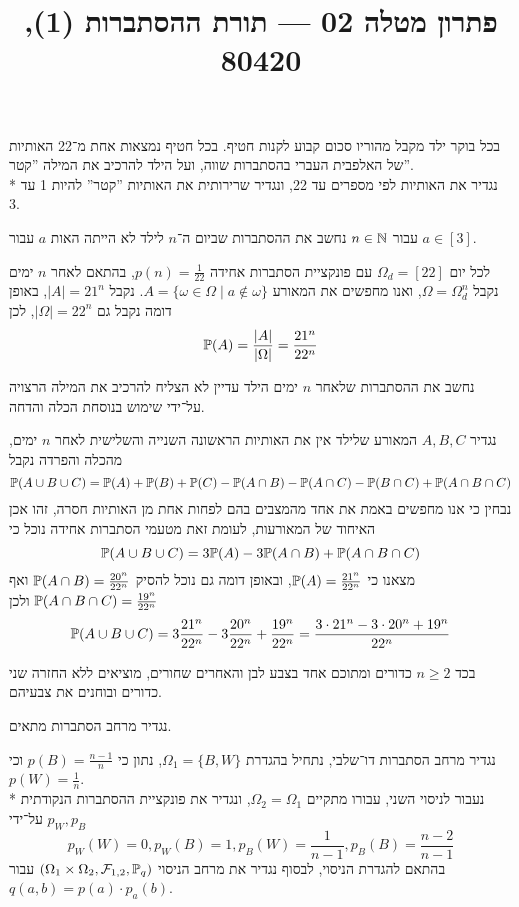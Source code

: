 
\title{פתרון מטלה 02 --- תורת ההסתברות (1), 80420}


\maketitle
\maketitleprint{}

\Question{}
בכל בוקר ילד מקבל מהוריו סכום קבוע לקנות חטיף. בכל חטיף נמצאות אחת מ־22 האותיות של האלפבית העברי בהסתברות שווה, ועל הילד להרכיב את המילה ''קטר''. \\*
נגדיר את האותיות לפי מספרים עד 22, ונגדיר שרירותית את האותיות ''קטר'' להיות 1 עד 3.

\Subquestion{}
עבור $n \in \mathbb{N}$ נחשב את ההסתברות שביום ה־$n$ לילד לא הייתה האות $a$ עבור $a \in [3]$.
\begin{solution}
	לכל יום $\Omega_d = [22]$ עם פונקציית הסתברות אחידה $p(n) = \frac{1}{22}$, בהתאם לאחר $n$ ימים נקבל $\Omega = \Omega_d^n$, ואנו מחפשים את המאורע $A = \{ \omega \in \Omega \mid a \notin \omega\}$.
	נקבל $|A| = 21^n$, באופן דומה נקבל גם $|\Omega| = 22^n$, לכן
	\[
		\mathbb{P}(A) = \frac{|A|}{|\Omega|} = \frac{21^n}{22^n}
	\]
\end{solution}

\Subquestion{}
נחשב את ההסתברות שלאחר $n$ ימים הילד עדיין לא הצליח להרכיב את המילה הרצויה על־ידי שימוש בנוסחת הכלה והדחה.
\begin{solution}
	נגדיר $A, B, C$ המאורע שלילד אין את האותיות הראשונה השנייה והשלישית לאחר $n$ ימים, מהכלה והפרדה נקבל
	\[
		\mathbb{P}(A \cup B \cup C) = \mathbb{P}(A) + \mathbb{P}(B) + \mathbb{P}(C) - \mathbb{P}(A \cap B) - \mathbb{P}(A \cap C) - \mathbb{P}(B \cap C) + \mathbb{P}(A \cap B \cap C)
	\]
	נבחין כי אנו מחפשים באמת את אחד מהמצבים בהם לפחות אחת מן האותיות חסרה, זהו אכן האיחוד של המאורעות, לעומת זאת מטעמי הסתברות אחידה נוכל כי
	\[
		\mathbb{P}(A \cup B \cup C) = 3\mathbb{P}(A) - 3\mathbb{P}(A \cap B) + \mathbb{P}(A \cap B \cap C)
	\]
	מצאנו כי $\mathbb{P}(A) = \frac{21^n}{22^n}$, ובאופן דומה גם נוכל להסיק $\mathbb{P}(A \cap B) = \frac{20^n}{22^n}$ ואף $\mathbb{P}(A \cap B \cap C) = \frac{19^n}{22^n}$ ולכן
	\[
		\mathbb{P}(A \cup B \cup C)
		= 3 \frac{21^n}{22^n} - 3 \frac{20^n}{22^n} + \frac{19^n}{22^n}
		= \frac{3 \cdot 21^n - 3 \cdot 20^n + 19^n}{22^n}
	\]
\end{solution}

\Question{}
בכד $n \ge 2$ כדורים ומתוכם אחד בצבע לבן והאחרים שחורים, מוציאים ללא החזרה שני כדורים ובוחנים את צבעיהם.

\Subquestion{}
נגדיר מרחב הסתברות מתאים.
\begin{solution}
	נגדיר מרחב הסתברות דו־שלבי, נתחיל בהגדרת $\Omega_1 = \{ B, W \}$, נתון כי $p(B) = \frac{n - 1}{n}$ וכי $p(W) = \frac{1}{n}$. \\*
	נעבור לניסוי השני, עבורו מתקיים $\Omega_2 = \Omega_1$, ונגדיר את פונקציית ההסתברות הנקודתית $p_W, p_B$ על־ידי
	\[
		p_W(W) = 0, p_W(B) = 1,
		p_B(W) = \frac{1}{n - 1}, p_B(B) = \frac{n - 2}{n - 1}
	\]
	בהתאם להגדרת הניסוי, לבסוף נגדיר את מרחב הניסוי $(\Omega_1 \times \Omega_2, \mathcal{F}_{1, 2}, \mathbb{P}_q)$ עבור $q(a, b) = p(a) \cdot p_a(b)$.
\end{solution}

